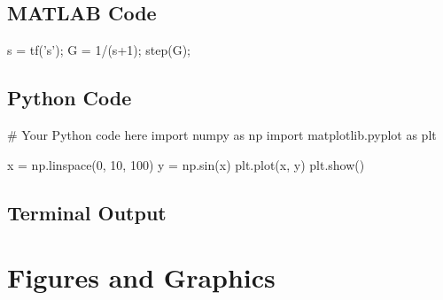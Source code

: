 \documentclass{../coursenotes}
\begin{document}

\subsection{MATLAB Code}

\begin{matlab}[caption=Description of Code]
s = tf('s');
G = 1/(s+1);
step(G);
\end{matlab}

\subsection{Python Code}

\begin{python}[caption=Python Implementation]
# Your Python code here
import numpy as np
import matplotlib.pyplot as plt

x = np.linspace(0, 10, 100)
y = np.sin(x)
plt.plot(x, y)
plt.show()
\end{python}

\subsection{Terminal Output}



\section{Figures and Graphics}



\end{document}
